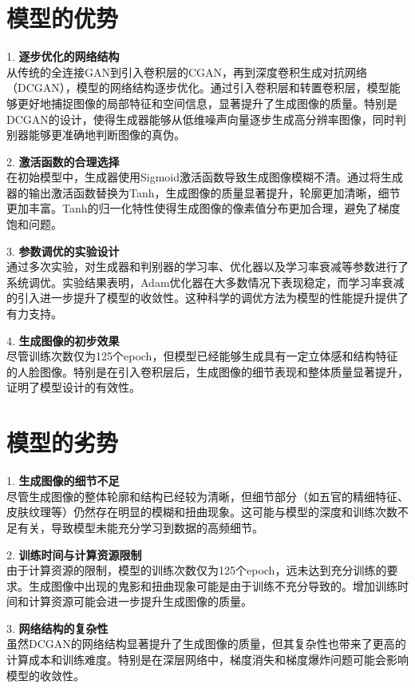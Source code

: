 \documentclass[UTF8]{ctexart}
\begin{document}
\section{模型的优势}
1. \textbf{逐步优化的网络结构}\\
   从传统的全连接GAN到引入卷积层的CGAN，再到深度卷积生成对抗网络（DCGAN），模型的网络结构逐步优化。通过引入卷积层和转置卷积层，模型能够更好地捕捉图像的局部特征和空间信息，显著提升了生成图像的质量。特别是DCGAN的设计，使得生成器能够从低维噪声向量逐步生成高分辨率图像，同时判别器能够更准确地判断图像的真伪。

2. \textbf{激活函数的合理选择}\\
   在初始模型中，生成器使用Sigmoid激活函数导致生成图像模糊不清。通过将生成器的输出激活函数替换为Tanh，生成图像的质量显著提升，轮廓更加清晰，细节更加丰富。Tanh的归一化特性使得生成图像的像素值分布更加合理，避免了梯度饱和问题。

3. \textbf{参数调优的实验设计}\\
   通过多次实验，对生成器和判别器的学习率、优化器以及学习率衰减等参数进行了系统调优。实验结果表明，Adam优化器在大多数情况下表现稳定，而学习率衰减的引入进一步提升了模型的收敛性。这种科学的调优方法为模型的性能提升提供了有力支持。

4. \textbf{生成图像的初步效果}\\
   尽管训练次数仅为125个epoch，但模型已经能够生成具有一定立体感和结构特征的人脸图像。特别是在引入卷积层后，生成图像的细节表现和整体质量显著提升，证明了模型设计的有效性。

\section{模型的劣势}
1. \textbf{生成图像的细节不足}\\
   尽管生成图像的整体轮廓和结构已经较为清晰，但细节部分（如五官的精细特征、皮肤纹理等）仍然存在明显的模糊和扭曲现象。这可能与模型的深度和训练次数不足有关，导致模型未能充分学习到数据的高频细节。

2. \textbf{训练时间与计算资源限制}\\
   由于计算资源的限制，模型的训练次数仅为125个epoch，远未达到充分训练的要求。生成图像中出现的鬼影和扭曲现象可能是由于训练不充分导致的。增加训练时间和计算资源可能会进一步提升生成图像的质量。

3. \textbf{网络结构的复杂性}\\
   虽然DCGAN的网络结构显著提升了生成图像的质量，但其复杂性也带来了更高的计算成本和训练难度。特别是在深层网络中，梯度消失和梯度爆炸问题可能会影响模型的收敛性。
\end{document}
